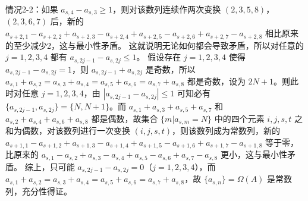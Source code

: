 \begin{question}[points=14]
\begin{solution}
情况2-2：如果 $a_{s,4}-a_{s,3}\geq 1$，则对该数列连续作两次变换 $(2,3,5,8)$，$(2,3,6,7)$ 后，新的 $a_{s+2,1}-a_{s+2,2}+a_{s+2,3}-a_{s+2,4}+a_{s+2,5}-a_{s+2,6}+a_{s+2,7}-a_{s+2,8}$ 相比原来的至少减少2，这与最小性矛盾。
这就说明无论如何都会导致矛盾，所以对任意的 $j=1,2,3,4$ 都有 $a_{s,2j-1}-a_{s,2j}\leq 1$。
假设存在 $j=1,2,3,4$ 使得 $a_{s,2j-1}-a_{s,2j}=1$，则 $a_{s,2j-1}+a_{s,2j}$ 是奇数，所以 $a_{s,1}+a_{s,2}=a_{s,3}+a_{s,4}=a_{s,5}+a_{s,6}=a_{s,7}+a_{s,8}$ 都是奇数，设为 $2N+1$。则此时对任意 $j=1,2,3,4$，由 $|a_{s,2j-1}-a_{s,2j}|\leq 1$ 可知必有 $\{a_{s,2j-1},a_{s,2j}\}=\{N,N+1\}$。而 $a_{s,1}+a_{s,3}+a_{s,5}+a_{s,7}$ 和 $a_{s,2}+a_{s,4}+a_{s,6}+a_{s,8}$ 都是偶数，故集合 $\{m|a_{s,m}=N\}$ 中的四个元素 $i,j,s,t$ 之和为偶数，对该数列进行一次变换 $(i,j,s,t)$，则该数列成为常数列，新的 $a_{s+1,1}-a_{s+1,2}+a_{s+1,3}-a_{s+1,4}+a_{s+1,5}-a_{s+1,6}+a_{s+1,7}-a_{s+1,8}$ 等于零，比原来的 $a_{s,1}-a_{s,2}+a_{s,3}-a_{s,4}+a_{s,5}-a_{s,6}+a_{s,7}-a_{s,8}$ 更小，这与最小性矛盾。
综上，只可能 $a_{s,2j-1}-a_{s,2j}=0$（$j=1,2,3,4$），而 $a_{s,1}+a_{s,2}=a_{s,3}+a_{s,4}=a_{s,5}+a_{s,6}=a_{s,7}+a_{s,8}$，故 $\{a_{s,n}\}=\Omega(A)$ 是常数列，充分性得证。
\end{solution}
\end{question}

